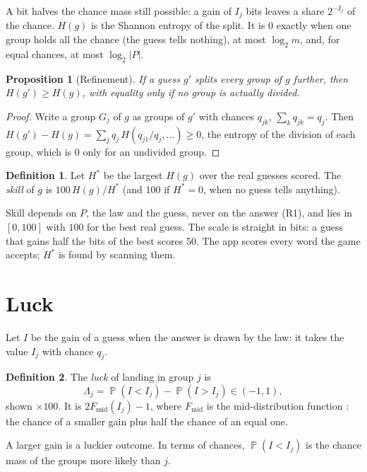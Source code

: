 \documentclass[11pt]{article}
\newtheorem{proposition}[theorem]{Proposition}
\theoremstyle{definition}
\newtheorem{definition}{Definition}
\theoremstyle{remark}
\DeclareMathOperator{\Prob}{\mathbb{P}}
\newcommand{\Gain}{I}
\newcommand{\Luck}{\Lambda}
\begin{document}
A bit halves the chance mass still possible: a gain of $\Gain_j$ bits leaves a
share $2^{-\Gain_j}$ of the chance. $H(g)$ is the Shannon entropy \cite{shannon1948}
of the split. It is $0$ exactly when one group holds all the chance (the guess tells
nothing), at most $\log_2 m$, and, for equal chances, at most $\log_2|P|$.

\begin{proposition}[Refinement]\label{prop:refine}
If a guess $g'$ splits every group of $g$ further, then $H(g')\ge H(g)$, with
equality only if no group is actually divided.
\end{proposition}
\begin{proof}
Write a group $G_j$ of $g$ as groups of $g'$ with chances $q_{jk}$, $\sum_k q_{jk}=q_j$.
Then $H(g')-H(g)=\sum_j q_j\,H(q_{j1}/q_j,\dots)\ge0$, the entropy of the division of
each group, which is $0$ only for an undivided group.
\end{proof}

\begin{definition}
Let $H^*$ be the largest $H(g)$ over the real guesses scored. The \emph{skill} of
$g$ is $100\,H(g)/H^*$ (and $100$ if $H^*=0$, when no guess tells anything).
\end{definition}

Skill depends on $P$, the law and the guess, never on the answer (R1), and lies in
$[0,100]$ with $100$ for the best real guess. The scale is straight in bits: a guess
that gains half the bits of the best scores 50. The app scores every word the game
accepts; $H^*$ is found by scanning them.

\section{Luck}\label{sec:luck}

Let $\Gain$ be the gain of a guess when the answer is drawn by the law: it takes the
value $\Gain_j$ with chance $q_j$.

\begin{definition}
The \emph{luck} of landing in group $j$ is
\[
\Luck_j=\Prob(\Gain<\Gain_j)-\Prob(\Gain>\Gain_j)\in(-1,1),
\]
shown $\times100$. It is $2F_{\mathrm{mid}}(\Gain_j)-1$, where $F_{\mathrm{mid}}$ is the
mid-distribution function \cite{lancaster1961,parzen2004}: the chance of a smaller gain
plus half the chance of an equal one.
\end{definition}

A larger gain is a luckier outcome. In terms of chances, $\Prob(\Gain<\Gain_j)$ is
the chance mass of the groups more likely than $j$.
\end{document}
